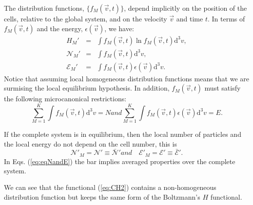 The distribution functions, $\{f_M(\vec{v},t)\}$, depend implicitly on the position of the cells,
relative to the global system, and on the velocity
$\vec{v}$ and time $t$. In terms of $f_M(\vec{v},t)$ and the energy, $\epsilon(\vec{v})$, we have:
%
\begin{subequations}
\begin{eqnarray}
    H_M' & = &  \int f_M(\vec{v},t) \ln f_{M}(\vec{v},t)
      \mathrm{d}^{3}v \label{Hcell},\\
    \mathcal{N}_M' & = & \int f_{M}(\vec{v} ,t) \mathrm{d}^{3}v,\\
    \mathcal{E}_M' & = & \int f_{M}(\vec{v},t)\epsilon(\vec{v}) \mathrm{d}^{3}v.
\end{eqnarray}
\end{subequations}
%
Notice that assuming local homogeneous distribution functions means that we are surmising the 
local equilibrium hypothesis. In addition, $f_{M}(\vec{v},t)$ must satisfy the following
microcanonical restrictions:
%
\begin{subequations}\label{eq:micro}
\begin{equation}\label{eq:micron}
    \sum_{M=1}^{K}\int f_M(\vec{v},t)\mathrm{d}^3v =N
\end{equation}
and
\begin{equation}\label{eq:microe}
    \sum_{M=1}^{K}\int f_M(\vec{v},t)\epsilon(\vec{v})\mathrm{d}^3v=E.
\end{equation}
\end{subequations}
%

If the complete system is in equilibrium, then the local number
of particles and the local
energy do not depend on the cell number, this is
%
\begin{subequations}\label{eq:eqNandE}
\begin{equation}
   \mathcal{N}'_M=\mathcal{N}'\equiv \bar{\mathcal{N}}'
\end{equation}
%
and
%
\begin{equation}
   \quad\mathcal{E}'_M=\mathcal{E}'\equiv\bar{\mathcal{E}}'.
\end{equation}
\end{subequations}
%
In Eqs. (\ref{eq:eqNandE}) the bar implies averaged properties over the complete system.

We can see that the functional (\ref{eq:CH2}) contains a non-homogeneous
distribution function but keeps the same form of the Boltzmann's $H$ functional.

